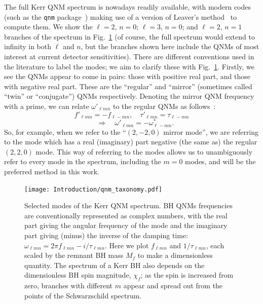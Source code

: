 The full Kerr QNM spectrum is nowadays readily available, with modern codes (such as the \texttt{qnm} package~\cite{Stein:2019mop}) making use of a version of Leaver's method~\cite{Leaver:1985ax} to compute them.
We show the $\ell = 2$, $n = 0$; $\ell = 3$, $n = 0$; and $\ell = 2$, $n = 1$ branches of the spectrum in Fig.~\ref{fig:ch1:qnm_taxonomy} (of course, the full spectrum would extend to infinity in both $\ell$ and $n$, but the branches shown here include the QNMs of most interest at current detector sensitivities).  
There are different conventions used in the literature to label the modes; we aim to clarify these with Fig.~\ref{fig:ch1:qnm_taxonomy}.
Firstly, we see the QNMs appear to come in pairs: those with positive real part, and those with negative real part.
These are the ``regular'' and ``mirror'' (sometimes called ``twin'' or ``conjugate'') QNMs respectively.
Denoting the mirror QNM frequency with a prime, we can relate $\omega'_{\ell m n}$ to the regular QNMs as follows~\cite{Berti:2005ys}:
\begin{equation}
    f'_{\ell m n} = -f_{\ell -m n}, \quad \tau'_{\ell m n} = \tau_{\ell -m n} \nonumber
\end{equation}
\begin{equation} 
    \quad\Rightarrow\quad \omega'_{\ell m n} = - \omega_{\ell -mn}^*.
    \label{ch1:eq:mirror}
\end{equation}
So, for example, when we refer to the ``$(2,-2,0)$ mirror mode'', we are referring to the mode which has a real (imaginary) part negative (the same as) the regular $(2,2,0)$ mode.
This way of referring to the modes allows us to unambiguously refer to every mode in the spectrum, including the $m=0$ modes, and will be the preferred method in this work.

\begin{figure}[t]
	\centering
	\texttt{[image: Introduction/qnm\_taxonomy.pdf]}
	\caption[The Kerr quasinormal mode spectrum]{ 
		Selected modes of the Kerr QNM spectrum. BH QNMs frequencies are conventionally represented as complex numbers, with the real part giving the  angular frequency of the mode and the imaginary part giving (minus) the inverse of the damping time: $\omega_{\ell m n} = 2\pi f_{\ell m n} - i/\tau_{\ell m n}$. Here we plot $f_{\ell m n}$ and $1/\tau_{\ell m n}$, each scaled by the remnant BH mass $M_f$ to make a dimensionless quantity. The spectrum of a Kerr BH also depends on the dimensionless BH spin magnitude, $\chi_f$; as the spin is increased from zero, branches with different $m$ appear and spread out from the points of the Schwarzschild spectrum.
        }
	\label{fig:ch1:qnm_taxonomy}
\end{figure}

